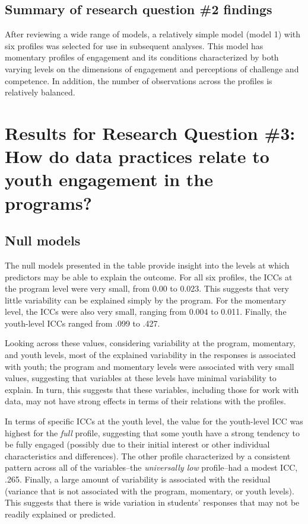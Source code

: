 \documentclass[]{msu-thesis}
\theoremstyle{definition}
\theoremstyle{definition}
\theoremstyle{definition}
\theoremstyle{remark}
\begin{document}
\subsection{Summary of research question \#2
findings}\label{summary-of-research-question-2-findings}

After reviewing a wide range of models, a relatively simple model (model
1) with six profiles was selected for use in subsequent analyses. This
model has momentary profiles of engagement and its conditions
characterized by both varying levels on the dimensions of engagement and
perceptions of challenge and competence. In addition, the number of
observations across the profiles is relatively balanced.

\section{Results for Research Question \#3: How do data practices relate
to youth engagement in the
programs?}\label{results-for-research-question-3-how-do-data-practices-relate-to-youth-engagement-in-the-programs}

\subsection{Null models}\label{null-models}

The null models presented in the table provide insight into the levels
at which predictors may be able to explain the outcome. For all six
profiles, the ICCs at the program level were very small, from 0.00 to
0.023. This suggests that very little variability can be explained
simply by the program. For the momentary level, the ICCs were also very
small, ranging from 0.004 to 0.011. Finally, the youth-level ICCs ranged
from .099 to .427.

Looking across these values, considering variability at the program,
momentary, and youth levels, most of the explained variability in the
responses is associated with youth; the program and momentary levels
were associated with very small values, suggesting that variables at
these levels have minimal variability to explain. In turn, this suggests
that these variables, including those for work with data, may not have
strong effects in terms of their relations with the profiles.

In terms of specific ICCs at the youth level, the value for the
youth-level ICC was highest for the \emph{full} profile, suggesting that
some youth have a strong tendency to be fully engaged (possibly due to
their initial interest or other individual characteristics and
differences). The other profile characterized by a consistent pattern
across all of the variables--the \emph{universally low} profile--had a
modest ICC, .265. Finally, a large amount of variability is associated
with the residual (variance that is not associated with the program,
momentary, or youth levels). This suggests that there is wide variation
in students' responses that may not be readily explained or predicted.
\end{document}
